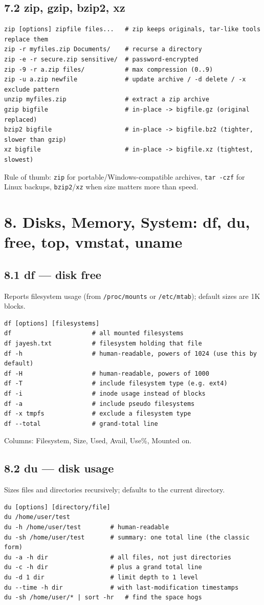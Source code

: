 \documentclass[11pt,a4paper]{article}
\newcommand{\cmd}[1]{\texttt{#1}}
\begin{document}
\subsection{7.2 zip, gzip, bzip2, xz}
\begin{lstlisting}
zip [options] zipfile files...   # zip keeps originals, tar-like tools replace them
zip -r myfiles.zip Documents/    # recurse a directory
zip -e -r secure.zip sensitive/  # password-encrypted
zip -9 -r a.zip files/           # max compression (0..9)
zip -u a.zip newfile             # update archive / -d delete / -x exclude pattern
unzip myfiles.zip                # extract a zip archive
gzip bigfile                     # in-place -> bigfile.gz (original replaced)
bzip2 bigfile                    # in-place -> bigfile.bz2 (tighter, slower than gzip)
xz bigfile                       # in-place -> bigfile.xz (tightest, slowest)
\end{lstlisting}
Rule of thumb: \cmd{zip} for portable/Windows-compatible archives, \cmd{tar -czf} for Linux backups, \cmd{bzip2}/\cmd{xz} when size matters more than speed.

\section{8. Disks, Memory, System: df, du, free, top, vmstat, uname}

\subsection{8.1 df --- disk free}
Reports filesystem usage (from \cmd{/proc/mounts} or \cmd{/etc/mtab}); default sizes are 1K blocks.
\begin{lstlisting}
df [options] [filesystems]
df                      # all mounted filesystems
df jayesh.txt           # filesystem holding that file
df -h                   # human-readable, powers of 1024 (use this by default)
df -H                   # human-readable, powers of 1000
df -T                   # include filesystem type (e.g. ext4)
df -i                   # inode usage instead of blocks
df -a                   # include pseudo filesystems
df -x tmpfs             # exclude a filesystem type
df --total              # grand-total line
\end{lstlisting}
Columns: Filesystem, Size, Used, Avail, Use\%, Mounted on.

\subsection{8.2 du --- disk usage}
Sizes files and directories recursively; defaults to the current directory.
\begin{lstlisting}
du [options] [directory/file]
du /home/user/test
du -h /home/user/test        # human-readable
du -sh /home/user/test       # summary: one total line (the classic form)
du -a -h dir                 # all files, not just directories
du -c -h dir                 # plus a grand total line
du -d 1 dir                  # limit depth to 1 level
du --time -h dir             # with last-modification timestamps
du -sh /home/user/* | sort -hr   # find the space hogs
\end{lstlisting}
\end{document}

